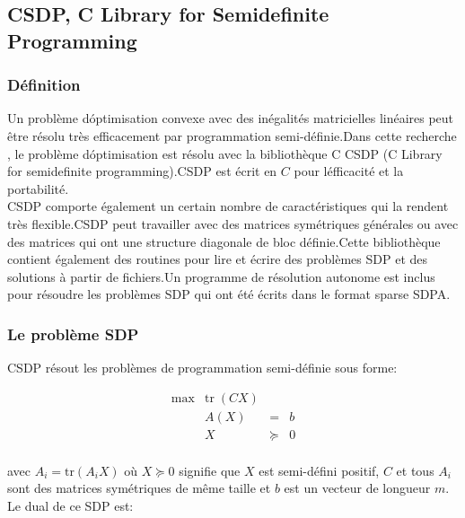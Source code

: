 \subsection{CSDP, C Library for Semidefinite Programming}
\subsubsection{Définition}

Un probl\`eme d\'optimisation convexe avec des in\'egalit\'es matricielles lin\'eaires peut \^etre r\'esolu tr\`es efficacement par programmation semi-d\'efinie.Dans cette recherche , le probl\`eme d\'optimisation est r\'esolu avec la biblioth\`eque C CSDP (C Library for semidefinite programming)\cite{Borchers.B:}.CSDP est \'ecrit en $C$ pour l\'efficacit\'e et la portabilit\'e.\\

CSDP comporte \'egalement un certain nombre de caract\'eristiques qui la rendent tr\`es flexible.CSDP peut travailler avec des matrices sym\'etriques g\'en\'erales ou avec des matrices qui ont une structure diagonale de bloc d\'efinie.Cette biblioth\`eque contient \'egalement des routines pour lire et \'ecrire des probl\`emes SDP et des solutions \`a partir de fichiers.Un programme de r\'esolution autonome est inclus pour r\'esoudre les probl\`emes SDP qui ont \'et\'e \'ecrits dans le format sparse SDPA\cite{SDPA}.

\subsubsection{Le probl\`eme SDP}
CSDP résout les problèmes de programmation semi-définie sous forme:

\begin{equation}
\begin{array}{rrcl}
\max  & \mbox{tr}\; (CX) & & \\
      & A(X) & = & b \\
      & X                   & \succeq & 0 \\
\end{array}
\end{equation}

avec $A_{i}= \mbox{tr}(A_{i}X)$ où $X \succeq 0$ signifie que $X$ est semi-défini positif, $C$ et tous $A_{i}$ sont des matrices symétriques de même taille et $b$ est un vecteur de longueur $m$.\\

Le dual de ce SDP est:

